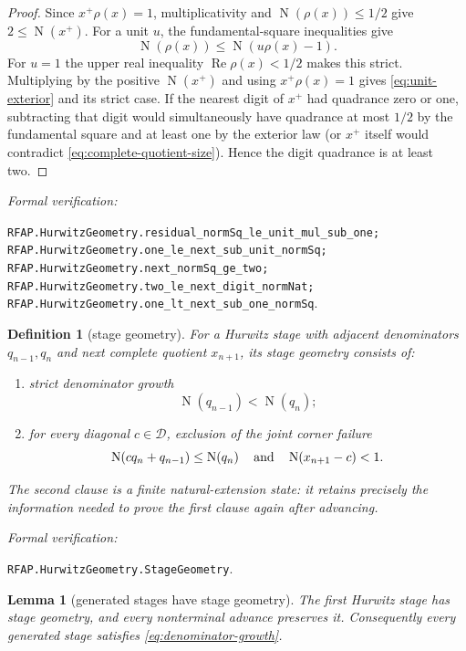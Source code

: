 \documentclass[11pt]{article}
\newtheorem{lemma}[lemma]{Lemma}
\newtheorem{definition}[definition]{Definition}
\newcommand{\Norm}[1]{\operatorname{N}\!\left(#1\right)}
\newcommand{\leanref}[1]{\par\smallskip\noindent
  \emph{Formal verification:}\par\nobreak
  {\raggedright\nolinkurl{#1}.\par}}
\begin{document}
\begin{proof}
Since $x^+\rho(x)=1$, multiplicativity and
$\Norm{\rho(x)}\le1/2$ give $2\le\Norm{x^+}$.  For a unit $u$, the
fundamental-square inequalities give
\[
                 \Norm{\rho(x)}
          \le \Norm{u\rho(x)-1}.
\]
For $u=1$ the upper real inequality
$\operatorname{Re}\rho(x)<1/2$ makes this strict.  Multiplying by the
positive $\Norm{x^+}$ and using $x^+\rho(x)=1$ gives
\eqref{eq:unit-exterior} and its strict case.  If the nearest digit of $x^+$
had quadrance zero or one, subtracting that digit would simultaneously have
quadrance at most $1/2$ by the fundamental square and at least one by the
exterior law (or $x^+$ itself would contradict
\eqref{eq:complete-quotient-size}).  Hence the digit quadrance is at least
two.
\end{proof}

\leanref{RFAP.HurwitzGeometry.residual_normSq_le_unit_mul_sub_one;
RFAP.HurwitzGeometry.one_le_next_sub_unit_normSq;
RFAP.HurwitzGeometry.next_normSq_ge_two;
RFAP.HurwitzGeometry.two_le_next_digit_normNat;
RFAP.HurwitzGeometry.one_lt_next_sub_one_normSq}

\begin{definition}[stage geometry]
\label{def:stage-geometry}
For a Hurwitz stage with adjacent denominators $q_{n-1},q_n$ and next
complete quotient $x_{n+1}$, its \emph{stage geometry} consists of:
\begin{enumerate}[label=(\roman*)]
\item strict denominator growth
\begin{equation}
\label{eq:denominator-growth}
                         \Norm{q_{n-1}}<\Norm{q_n};
\end{equation}
\item for every diagonal $c\in\mathcal D$, exclusion of the joint corner
failure
\begin{equation}
\label{eq:corner-failure}
 \Norm{cq_n+q_{n-1}}\le\Norm{q_n}
 \quad\hbox{and}\quad
 \Norm{x_{n+1}-c}<1.
\end{equation}
\end{enumerate}
The second clause is a finite natural-extension state: it retains precisely
the information needed to prove the first clause again after advancing.
\end{definition}

\leanref{RFAP.HurwitzGeometry.StageGeometry}

\begin{lemma}[generated stages have stage geometry]
\label{lem:generated-stage-geometry}
The first Hurwitz stage has stage geometry, and every nonterminal advance
preserves it.  Consequently every generated stage satisfies
\eqref{eq:denominator-growth}.
\end{lemma}
\end{document}

